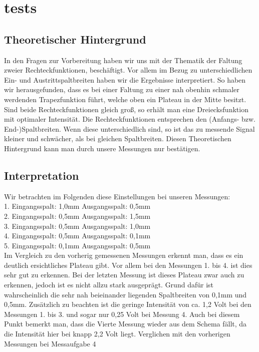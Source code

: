 

\section{tests}
\subsection {Theoretischer Hintergrund}
In den Fragen zur Vorbereitung haben wir uns mit der Thematik der Faltung zweier Rechteckfunktionen, besch\"aftigt. Vor allem im Bezug zu unterschiedlichen Ein- und Austrittspaltbreiten haben wir die Ergebnisse interpretiert. So haben wir herausgefunden, dass es bei einer Faltung zu einer nah obenhin schmaler werdenden Trapezfunktion f\"uhrt, welche oben ein Plateau in der Mitte besitzt. Sind beide Rechteckfunktionen gleich gro\ss{}, so erh\"alt man eine Dreiecksfunktion mit optimaler Intensit\"at. Die Rechteckfunktionen entsprechen den (Anfangs- bzw. End-)Spaltbreiten. Wenn diese unterschiedlich sind, so ist das zu messende Signal kleiner und schw\"acher, als bei gleichen Spaltbreiten. Diesen Theoretischen Hintergrund kann man  durch unsere Messungen nur best\"atigen. 

\subsection {Interpretation} 
Wir betrachten im Folgenden diese Einstellungen bei unseren Messungen:\\
1. Eingangsspalt: 1,0mm \tab Ausgangsspalt: 0,5mm\\
2. Eingangsspalt: 0,5mm \tab Ausgangsspalt: 1,5mm\\
3. Eingangsspalt: 0,5mm \tab Ausgangsspalt: 1,0mm\\
4. Eingangsspalt: 0,5mm \tab Ausgangsspalt: 0,1mm\\
5. Eingangsspalt: 0,1mm \tab Ausgangsspalt: 0,5mm\\


Im Vergleich zu den vorherig gemessenen Messungen erkennt man, dass es ein deutlich ersichtliches Plateau gibt. Vor allem bei den Messungen 1. bis 4. ist dies sehr gut zu erkennen. Bei der letzten Messung ist dieses Plateau zwar auch zu erkennen, jedoch ist es nicht allzu stark ausgepr\"agt. Grund daf\"ur ist wahrscheinlich die sehr nah beieinander liegenden Spaltbreiten von 0,1mm und 0,5mm. 
Zus\"atzlich zu beachten ist die geringe Intensit\"at von ca. 1,2 Volt bei den Messungen 1. bis 3. und sogar nur 0,25 Volt bei Messung 4.  
Auch bei diesem Punkt bemerkt man, dass die Vierte Messung wieder aus dem Schema f\"allt, da die Intensit\"at hier bei knapp 2,2 Volt liegt. Verglichen mit den vorherigen Messungen bei Messaufgabe 4